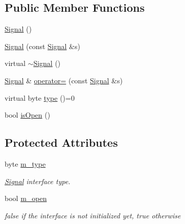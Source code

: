 \subsection*{Public Member Functions}
\begin{DoxyCompactItemize}
\item 
\hyperlink{classsmrtobj_1_1io_1_1_signal_a7e69e538253d90c3f551f4701a1f94a5}{Signal} ()
\item 
\hyperlink{classsmrtobj_1_1io_1_1_signal_a0482d58a322aeb3be54aa446442f0663}{Signal} (const \hyperlink{classsmrtobj_1_1io_1_1_signal}{Signal} \&s)
\item 
virtual \hyperlink{classsmrtobj_1_1io_1_1_signal_ae7a1d116cda63e790bf9aab549d57d3a}{$\sim$\+Signal} ()
\item 
\hyperlink{classsmrtobj_1_1io_1_1_signal}{Signal} \& \hyperlink{classsmrtobj_1_1io_1_1_signal_a749ffe1ea8adb870aa211f346de35e08}{operator=} (const \hyperlink{classsmrtobj_1_1io_1_1_signal}{Signal} \&s)
\item 
virtual byte \hyperlink{classsmrtobj_1_1io_1_1_signal_a38cd36f413f1ad2213684e4364ac4270}{type} ()=0
\item 
bool \hyperlink{classsmrtobj_1_1io_1_1_signal_a6486ccfa94b91c8596e6f11f61736844}{is\+Open} ()
\end{DoxyCompactItemize}
\subsection*{Protected Attributes}
\begin{DoxyCompactItemize}
\item 
\hypertarget{classsmrtobj_1_1io_1_1_signal_acb7bac283b07ef39ec419a83b98df929}{}byte \hyperlink{classsmrtobj_1_1io_1_1_signal_acb7bac283b07ef39ec419a83b98df929}{m\+\_\+type}\label{classsmrtobj_1_1io_1_1_signal_acb7bac283b07ef39ec419a83b98df929}

\begin{DoxyCompactList}\small\item\em \hyperlink{classsmrtobj_1_1io_1_1_signal}{Signal} interface type. \end{DoxyCompactList}\item 
\hypertarget{classsmrtobj_1_1io_1_1_signal_a2f7993ca7fcf743c5ce6bc4d69444c93}{}bool \hyperlink{classsmrtobj_1_1io_1_1_signal_a2f7993ca7fcf743c5ce6bc4d69444c93}{m\+\_\+open}\label{classsmrtobj_1_1io_1_1_signal_a2f7993ca7fcf743c5ce6bc4d69444c93}

\begin{DoxyCompactList}\small\item\em false if the interface is not initialized yet, true otherwise \end{DoxyCompactList}\end{DoxyCompactItemize}


